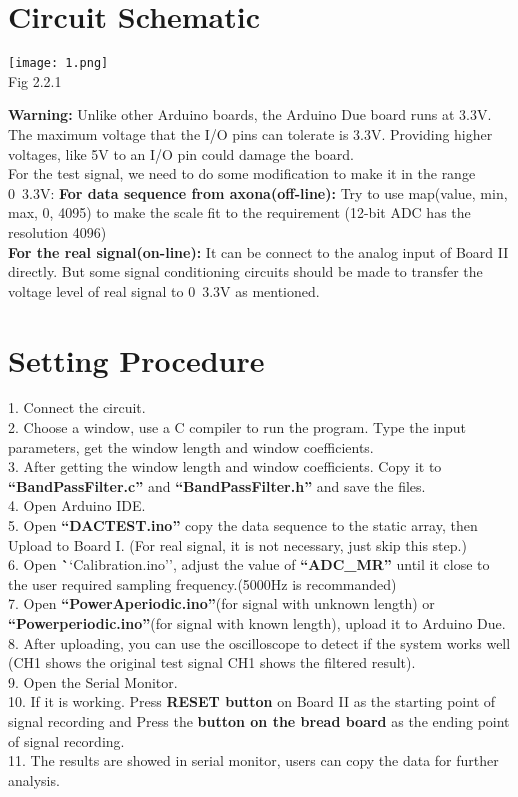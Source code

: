 \documentclass[12pt]{report}
\begin{document}
\section{Circuit Schematic}
\vspace{5pt}
\begin{center}
\texttt{[image: 1.png]}\\
\textup{\footnotesize Fig 2.2.1\\}
\end{center}
\textbf{Warning:} Unlike other Arduino boards, the Arduino Due board runs at 3.3V. The maximum voltage that the I/O pins can tolerate is 3.3V. Providing higher voltages, like 5V to an I/O pin could damage the board.\\For the test signal, we need to do some modification to make it in the range 0~3.3V:\vspace{3pt}
\textbf{For data sequence from axona(off-line):}
Try to use map(value, min, max, 0, 4095) to make the scale fit to the requirement (12-bit ADC has the resolution 4096)\\ 
\textbf{For the real signal(on-line):}
\textup{It can be connect to the analog input of Board II directly. But some signal conditioning circuits should be made to transfer the voltage level of real signal to 0~3.3V as mentioned.}
\vspace{5pt}
\section{Setting Procedure}
1. Connect the circuit.\\
2. Choose a window, use a C compiler to run the program. Type the input parameters, get the window length and window coefficients.\\
3. After getting the window length and window coefficients. Copy it to \textbf{``BandPassFilter.c''} and \textbf{``BandPassFilter.h''} and save the files.\\
4. Open Arduino IDE.\\
5. Open \textbf{``DACTEST.ino''} copy the data sequence to the static array, then Upload to Board I. (For real signal, it is not necessary, just skip this step.)\\
6. Open \textbf``Calibration.ino'', adjust the value of \textbf{``ADC\_MR''} until it close to the user required sampling frequency.(5000Hz is recommanded)\\
7. Open \textbf{``PowerAperiodic.ino''}(for signal with unknown length) or \textbf{``Powerperiodic.ino''}(for signal with known length), upload it to Arduino Due.\\
8. After uploading, you can use the oscilloscope to detect if the system works well
(CH1 shows the original test signal CH1 shows the filtered result).\\
9. Open the Serial Monitor.\\
10. If it is working. Press \textbf{RESET button} on Board II as the starting point of signal recording and Press the \textbf{button on the bread board} as the ending point of signal recording.\\
11. The results are showed in serial monitor, users can copy the data for further analysis.\\
\newpage
\end{document}
